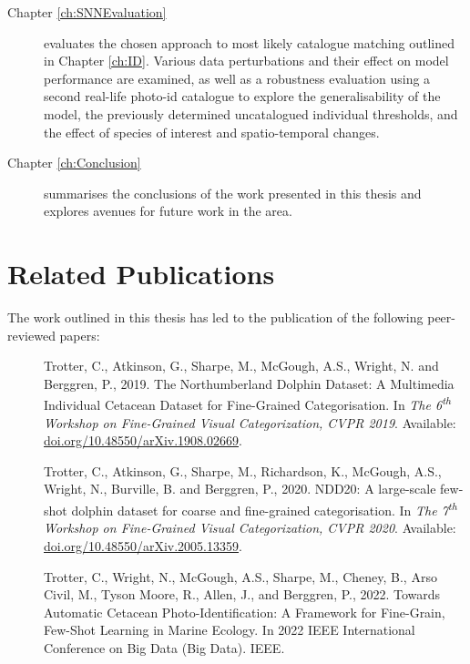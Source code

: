 \begin{description}
	\item[Chapter \ref{ch:SNNEvaluation}] evaluates the chosen approach to most likely catalogue matching outlined in Chapter \ref{ch:ID}. Various data perturbations and their effect on model performance are examined, as well as a robustness evaluation using a second real-life photo-id catalogue to explore the generalisability of the model, the previously determined uncatalogued individual thresholds, and the effect of species of interest and spatio-temporal changes.
	
	\item[Chapter \ref{ch:Conclusion}] summarises the conclusions of the work presented in this thesis and explores avenues for future work in the area.  
	 
\end{description}

\section{Related Publications}\label{ch:intro,relatedPublications}

The work outlined in this thesis has led to the publication of the following peer-reviewed papers:

\begin{description}
	\item[\cite{trotter_northumberland_2019}] Trotter, C., Atkinson, G., Sharpe, M., McGough, A.S., Wright, N. and Berggren, P., 2019. The Northumberland Dolphin Dataset: A Multimedia Individual Cetacean Dataset for Fine-Grained Categorisation. In \textit{The 6\textsuperscript{th} Workshop on Fine-Grained Visual Categorization, CVPR 2019}. Available: \href{https://doi.org/10.48550/arXiv.1908.02669}{doi.org/10.48550/arXiv.1908.02669}.
	
	\newpage
	
	\item[\cite{trotter_ndd20_2020}] Trotter, C., Atkinson, G., Sharpe, M., Richardson, K., McGough, A.S., Wright, N., Burville, B. and Berggren, P., 2020. NDD20: A large-scale few-shot dolphin dataset for coarse and fine-grained categorisation. In \textit{The 7\textsuperscript{th} Workshop on Fine-Grained Visual Categorization, CVPR 2020}. Available: \href{https://doi.org/10.48550/arXiv.2005.13359}{doi.org/10.48550/arXiv.2005.13359}.
	
	\item [\cite{trotter_towards_2022}] Trotter, C., Wright, N., McGough, A.S., Sharpe, M., Cheney, B., Arso Civil, M., Tyson Moore, R., Allen, J., and Berggren, P., 2022. Towards Automatic Cetacean Photo-Identification: A Framework for Fine-Grain, Few-Shot Learning in Marine Ecology. In 2022 IEEE International Conference on Big Data (Big Data). IEEE.
\end{description}

